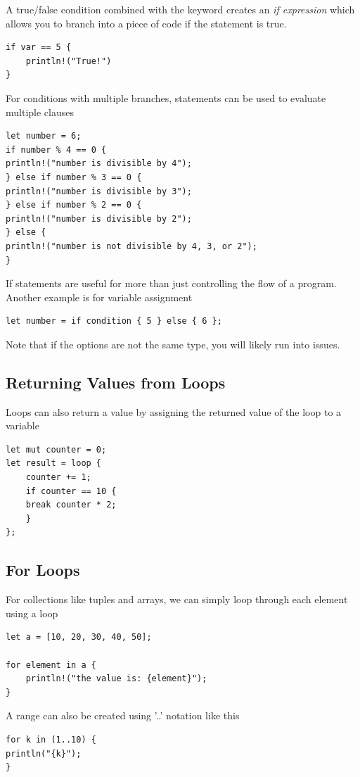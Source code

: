 \documentclass[]{article}
\begin{document}
A true/false condition combined with the  keyword creates an \emph{if expression} which allows you to branch into a piece of code if the statement is true.
\begin{verbatim}
if var == 5 {
    println!("True!")
}
\end{verbatim}
For conditions with multiple branches,  statements can be used to evaluate multiple clauses
\begin{verbatim}
let number = 6;
if number % 4 == 0 {
println!("number is divisible by 4");
} else if number % 3 == 0 {
println!("number is divisible by 3");
} else if number % 2 == 0 {
println!("number is divisible by 2");
} else {
println!("number is not divisible by 4, 3, or 2");
}
\end{verbatim}
If statements are useful for more than just controlling the flow of a program.
Another example is for variable assignment
\begin{verbatim}
let number = if condition { 5 } else { 6 };
\end{verbatim}
Note that if the options are not the same type, you will likely run into issues.
\subsection{Returning Values from Loops}

Loops can also return a value by assigning the returned value of the loop to a variable
\begin{verbatim}
let mut counter = 0;
let result = loop {
    counter += 1;
    if counter == 10 {
    break counter * 2;
    }
};
\end{verbatim}
\subsection{For Loops}

For collections like tuples and arrays, we can simply loop through each element using a  loop
\begin{verbatim}
let a = [10, 20, 30, 40, 50];
    
for element in a {
    println!("the value is: {element}");
}
\end{verbatim}
A range can also be created using '..' notation like this
\begin{verbatim}
for k in (1..10) {
println("{k}");
}
\end{verbatim}
\end{document}
